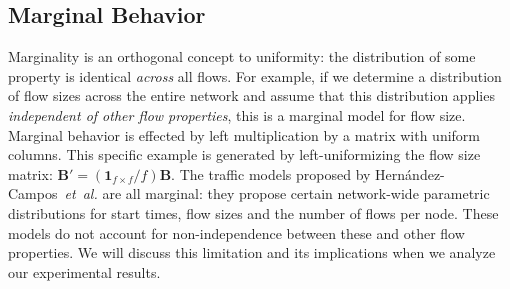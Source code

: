 \documentclass[twocolumn,final]{svjour3}
\newcommand{\caps}[1]{{\small{#1}}}
\newcommand{\Section}[1]{\hyperref[sec:#1]{Section~\ref*{sec:#1}}}
\newcommand{\FHC}{Hern\'andez-Campos~\textit{et~al.}}
\newcommand{\R}{\mathbb{R}}
\newcommand{\ones}[1]{\mathbf{1}_{#1}}
\newcommand{\zeros}[1]{\mathbf{0}_{#1}}
\newcommand{\mat}[1]{\mathbf{#1}}
\newcommand{\seq}[1]{\left<#1\right>}
\begin{document}

\subsection{Marginal Behavior}

Marginality is an orthogonal concept to uniformity: the distribution of some property is identical \textit{across} all flows. For example, if we determine a distribution of flow sizes across the entire network and assume that this distribution applies \textit{independent of other flow properties}, this is a marginal model for flow size. Marginal behavior is effected by left multiplication by a matrix with uniform columns. This specific example is generated by left-uniformizing the flow size matrix: $\mat{B}' = (\ones{f \times f}/f)\mat{B}$.
The traffic models proposed by {\FHC} are all marginal: they propose certain network-wide parametric distributions for start times, flow sizes and the number of flows per node. These models do not account for non-independence between these and other flow properties. We will discuss this limitation and its implications when we analyze our experimental results.
\end{document}
